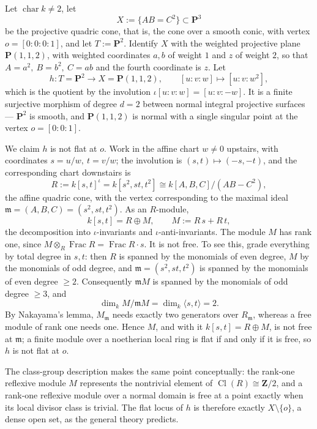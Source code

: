 \begin{example}
\label{ex:ch41-nonflat-cone}
Let $\operatorname{char}k\ne2$, let
\[
 X:=\{AB=C^2\}\subset\mathbf P^3
\]
be the projective quadric cone, that is, the cone over a smooth conic, with
vertex $o=[0:0:0:1]$, and let $T:=\mathbf P^2$.  Identify $X$ with the
weighted projective plane $\mathbf P(1,1,2)$, with weighted coordinates
$a,b$ of weight $1$ and $z$ of weight $2$, so that
$A=a^2,\ B=b^2,\ C=ab$ and the fourth coordinate is $z$.  Let
\[
 h:T=\mathbf P^2\longrightarrow X=\mathbf P(1,1,2),
 \qquad
 [u:v:w]\longmapsto[u:v:w^2],
\]
which is the quotient by the involution
$\iota[u:v:w]=[u:v:-w]$.  It is a finite surjective morphism of degree
$d=2$ between normal integral projective surfaces --- $\mathbf P^2$ is
smooth, and $\mathbf P(1,1,2)$ is normal with a single singular point at
the vertex $o=[0:0:1]$.

We claim $h$ is not flat at $o$.  Work in the affine chart
$w\ne0$ upstairs, with coordinates $s=u/w,\ t=v/w$; the involution is
$(s,t)\mapsto(-s,-t)$, and the corresponding chart downstairs is
\[
 R:=k[s,t]^{\iota}=k[s^2,st,t^2]\cong k[A,B,C]/(AB-C^2),
\]
the affine quadric cone, with the vertex corresponding to the maximal ideal
$\mathfrak m=(A,B,C)=(s^2,st,t^2)$.  As an $R$-module,
\[
 k[s,t]=R\oplus M,
 \qquad
 M:=R\,s+R\,t,
\]
the decomposition into $\iota$-invariants and $\iota$-anti-invariants.
The module $M$ has rank one, since
$M\otimes_R\operatorname{Frac}R=\operatorname{Frac}R\cdot s$.  It is not
free.  To see this, grade everything by total degree in $s,t$: then
$R$ is spanned by the monomials of even degree, $M$ by the monomials of
odd degree, and $\mathfrak m=(s^2,st,t^2)$ is spanned by the monomials of
even degree $\ge2$.  Consequently $\mathfrak mM$ is spanned by the
monomials of odd degree $\ge3$, and
\[
 \dim_k M/\mathfrak mM=\dim_k\langle s,t\rangle=2 .
\]
By Nakayama's lemma, $M_{\mathfrak m}$ needs exactly two generators over
$R_{\mathfrak m}$, whereas a free module of rank one needs one.  Hence
$M$, and with it $k[s,t]=R\oplus M$, is not free at $\mathfrak m$; a
finite module over a noetherian local ring is flat if and only if it is
free, so $h$ is not flat at $o$.

The class-group description makes the same point conceptually:
the rank-one reflexive module $M$ represents the nontrivial element of $\operatorname{Cl}(R)\cong\mathbf
Z/2$, and a rank-one reflexive module over a normal domain is free at a
point exactly when its local divisor class is trivial.  The flat locus of $h$ is
therefore exactly $X\setminus\{o\}$, a dense open set, as the general
theory predicts.
\end{example}

